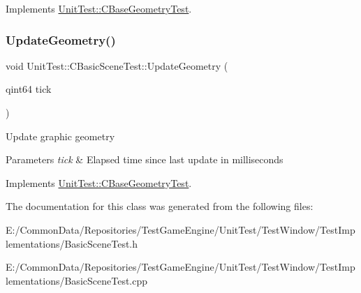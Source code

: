 Implements \mbox{\hyperlink{class_unit_test_1_1_c_base_geometry_test_a16e5804e7f134ae519722c47e756e3b0}{Unit\+Test\+::\+C\+Base\+Geometry\+Test}}.

\mbox{\label{class_unit_test_1_1_c_basic_scene_test_a670726a40875ee0981cca18a3ea7ad0b}} 
\subsubsection{\texorpdfstring{UpdateGeometry()}{UpdateGeometry()}}
{\footnotesize\ttfamily void Unit\+Test\+::\+C\+Basic\+Scene\+Test\+::\+Update\+Geometry (\begin{DoxyParamCaption}\item[{qint64}]{tick }\end{DoxyParamCaption})\hspace{0.3cm}{\ttfamily [virtual]}}

Update graphic geometry 
\begin{DoxyParams}{Parameters}
{\em tick} & Elapsed time since last update in milliseconds \\
\hline
\end{DoxyParams}


Implements \mbox{\hyperlink{class_unit_test_1_1_c_base_geometry_test_afe9560d667ef457f7a203453c10593fd}{Unit\+Test\+::\+C\+Base\+Geometry\+Test}}.



The documentation for this class was generated from the following files\+:\begin{DoxyCompactItemize}
\item 
E\+:/\+Common\+Data/\+Repositories/\+Test\+Game\+Engine/\+Unit\+Test/\+Test\+Window/\+Test\+Implementations/Basic\+Scene\+Test.\+h\item 
E\+:/\+Common\+Data/\+Repositories/\+Test\+Game\+Engine/\+Unit\+Test/\+Test\+Window/\+Test\+Implementations/Basic\+Scene\+Test.\+cpp\end{DoxyCompactItemize}

